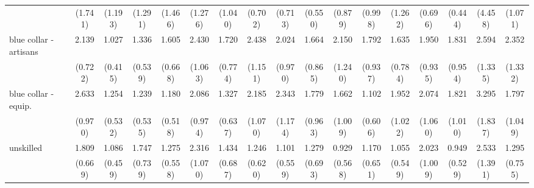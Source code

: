 {\begin{tabular}{l*{16}{c}}
                    &     (1.741)         &     (1.193)         &     (1.291)         &     (1.466)         &     (1.276)         &     (1.040)         &     (0.702)         &     (0.713)         &     (0.550)         &     (0.879)         &     (0.998)         &     (1.262)         &     (0.696)         &     (0.444)         &     (4.458)         &     (1.071)         \\
[1em]
blue collar - artisans&       2.139\sym{*}  &       1.027         &       1.336         &       1.605         &       2.430\sym{*}  &       1.720         &       2.438         &       2.024         &       1.664         &       2.150         &       1.792         &       1.635         &       1.950         &       1.831         &       2.594         &       2.352         \\
                    &     (0.722)         &     (0.415)         &     (0.539)         &     (0.668)         &     (1.063)         &     (0.774)         &     (1.151)         &     (0.970)         &     (0.865)         &     (1.240)         &     (0.937)         &     (0.784)         &     (0.935)         &     (0.954)         &     (1.335)         &     (1.332)         \\
[1em]
blue collar - equip.&       2.633\sym{**} &       1.254         &       1.239         &       1.180         &       2.086         &       1.327         &       2.185         &       2.343         &       1.779         &       1.662         &       1.102         &       1.952         &       2.074         &       1.821         &       3.295\sym{*}  &       1.797         \\
                    &     (0.970)         &     (0.532)         &     (0.535)         &     (0.518)         &     (0.974)         &     (0.637)         &     (1.070)         &     (1.174)         &     (0.963)         &     (1.009)         &     (0.606)         &     (1.022)         &     (1.060)         &     (1.010)         &     (1.837)         &     (1.049)         \\
[1em]
unskilled           &       1.809         &       1.086         &       1.747         &       1.275         &       2.316         &       1.434         &       1.246         &       1.101         &       1.279         &       0.929         &       1.170         &       1.055         &       2.023         &       0.949         &       2.533         &       1.295         \\
                    &     (0.669)         &     (0.459)         &     (0.739)         &     (0.558)         &     (1.070)         &     (0.687)         &     (0.620)         &     (0.559)         &     (0.693)         &     (0.568)         &     (0.651)         &     (0.549)         &     (1.009)         &     (0.529)         &     (1.391)         &     (0.755)         \\

\end{tabular}}
